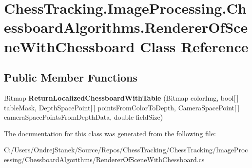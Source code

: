 \hypertarget{class_chess_tracking_1_1_image_processing_1_1_chessboard_algorithms_1_1_renderer_of_scene_with_chessboard}{}\section{Chess\+Tracking.\+Image\+Processing.\+Chessboard\+Algorithms.\+Renderer\+Of\+Scene\+With\+Chessboard Class Reference}
\label{class_chess_tracking_1_1_image_processing_1_1_chessboard_algorithms_1_1_renderer_of_scene_with_chessboard}
\subsection*{Public Member Functions}
\begin{DoxyCompactItemize}
\item 
\mbox{\label{class_chess_tracking_1_1_image_processing_1_1_chessboard_algorithms_1_1_renderer_of_scene_with_chessboard_a4b1f3ba8fc230d35df07c433fb30482a}} 
Bitmap {\bfseries Return\+Localized\+Chessboard\+With\+Table} (Bitmap color\+Img, bool\mbox{[}$\,$\mbox{]} table\+Mask, Depth\+Space\+Point\mbox{[}$\,$\mbox{]} points\+From\+Color\+To\+Depth, Camera\+Space\+Point\mbox{[}$\,$\mbox{]} camera\+Space\+Points\+From\+Depth\+Data, double field\+Size)
\end{DoxyCompactItemize}


The documentation for this class was generated from the following file\+:\begin{DoxyCompactItemize}
\item 
C\+:/\+Users/\+Ondrej\+Stanek/\+Source/\+Repos/\+Chess\+Tracking/\+Chess\+Tracking/\+Image\+Processing/\+Chessboard\+Algorithms/Renderer\+Of\+Scene\+With\+Chessboard.\+cs\end{DoxyCompactItemize}

